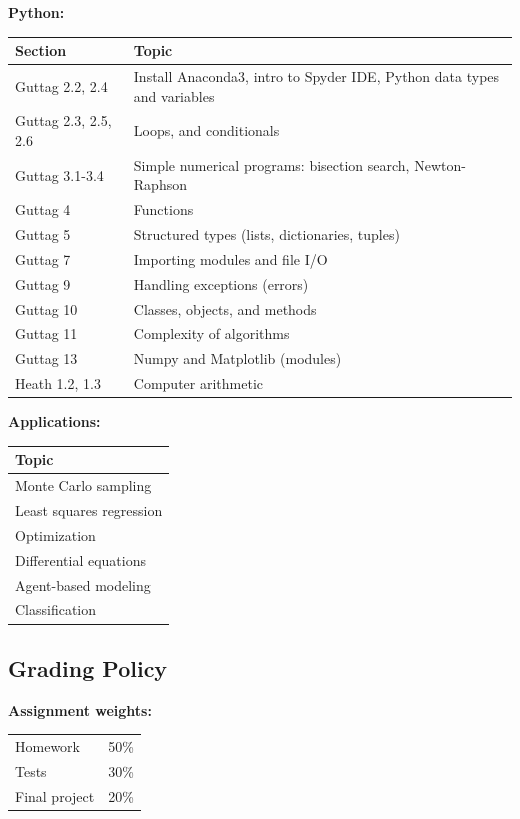 \documentclass[11pt]{article}
\begin{document}
\textbf{Python:} \\

\begin{tabular}{ | p{3.5cm} p{8.5cm} | }
	\hline
	Section & Topic \\
	\hline
	Guttag 2.2, 2.4 & Install Anaconda3, intro to Spyder IDE, Python data types and variables \\
	Guttag 2.3, 2.5, 2.6 & Loops, and conditionals \\
	Guttag 3.1-3.4 & Simple numerical programs: bisection search, Newton-Raphson \\
	Guttag 4 & Functions \\
	Guttag 5 & Structured types (lists, dictionaries, tuples) \\
	Guttag 7 & Importing modules and file I/O \\
	Guttag 9 & Handling exceptions (errors) \\
	Guttag 10 & Classes, objects, and methods \\
	Guttag 11 & Complexity of algorithms \\
	Guttag 13 & Numpy and Matplotlib (modules) \\
	Heath 1.2, 1.3 & Computer arithmetic \\
	\hline
\end{tabular}

\vspace{10pt}

\textbf{Applications:} \\

\begin{tabular}{ | p{13.0cm} | }
	\hline
	Topic \\
	\hline
	Monte Carlo sampling \\
	Least squares regression \\
	Optimization \\
	Differential equations \\
	Agent-based modeling \\
	Classification \\
	\hline
\end{tabular}

\subsection*{Grading Policy}

\textbf{Assignment weights:} \\

\begin{tabular}{ | p{3cm} p{1cm} | }
	\hline
	Homework	& 50\% \\
	Tests 			& 30\% \\
	Final project	& 20\% \\
	\hline
\end{tabular}
\end{document}
